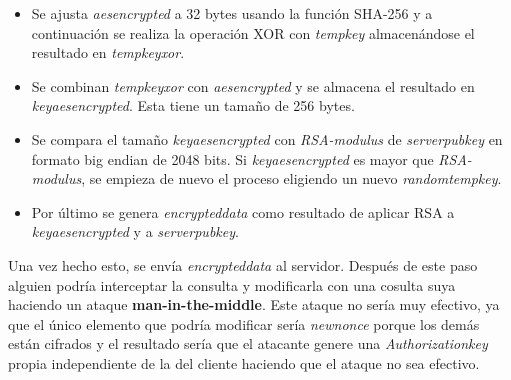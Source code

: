 \begin{enumerate}
\begin{enumerate}
\begin{itemize}
	\item Se ajusta \emph{aes\textunderscore encrypted} a 32 bytes usando la función SHA-256 y a continuación se realiza la operación XOR con \emph{temp\textunderscore key} almacenándose el resultado en \emph{temp\textunderscore key\textunderscore xor}.
	\item Se combinan \emph{temp\textunderscore key\textunderscore xor} con \emph{aes\textunderscore encrypted} y se almacena el resultado en \emph{key\textunderscore aes\textunderscore encrypted}. Esta tiene un tamaño de 256 bytes. 
	\item Se compara el tamaño \emph{key\textunderscore aes\textunderscore encrypted} con \emph{RSA-modulus} de \emph{server\textunderscore pub\textunderscore key} en formato big endian de 2048 bits. Si \emph{key\textunderscore aes\textunderscore encrypted} es mayor que \emph{RSA-modulus}, se empieza de nuevo el proceso eligiendo un nuevo \emph{random\textunderscore temp\textunderscore key}.
	\item Por último se genera \emph{encrypted\textunderscore data} como resultado de aplicar RSA a \emph{key\textunderscore aes\textunderscore encrypted} y a \emph{server\textunderscore pub\textunderscore key}.
		\end{itemize}
	\end{enumerate}
	Una vez hecho esto, se envía \emph{encrypted\textunderscore data} al servidor.
	Después de este paso alguien podría interceptar la consulta y modificarla con una cosulta suya haciendo un ataque \textbf{man-in-the-middle}. 
	Este ataque no sería muy efectivo, ya que el único elemento que podría modificar sería \emph{new\textunderscore nonce} porque los demás están cifrados y el resultado sería que el atacante genere una \emph{Authorization\textunderscore key} propia independiente de la del cliente haciendo que el ataque no sea efectivo.


\end{enumerate}
